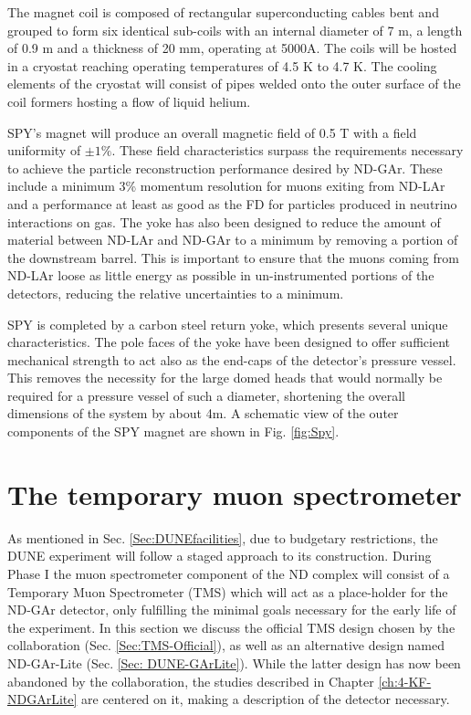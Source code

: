 The magnet coil is composed of rectangular superconducting cables bent and grouped to form six identical sub-coils with an internal diameter of 7 m, a length of 0.9 m and a thickness of 20 mm, operating at 5000A. The coils will be hosted in a cryostat reaching operating temperatures of 4.5 K to 4.7 K. The cooling elements of the cryostat will consist of pipes welded onto the outer surface of the coil formers hosting a flow of liquid helium. 

SPY's magnet will produce an overall magnetic field of 0.5 T with a field uniformity of $\pm 1\%$. These field characteristics surpass the requirements necessary to achieve the particle reconstruction performance desired by ND-GAr. These include a minimum 3\% momentum resolution for muons exiting from ND-LAr and a performance at least as good as the FD for particles produced in neutrino interactions on gas. The yoke has also been designed to reduce the amount of material between ND-LAr and ND-GAr to a minimum by removing a portion of the downstream barrel. This is important to ensure that the muons coming from ND-LAr loose as little energy as possible in un-instrumented portions of the detectors, reducing the relative uncertainties to a minimum.

SPY is completed by a carbon steel return yoke, which presents several unique characteristics. The pole faces of the yoke have been designed to offer sufficient mechanical strength to act also as the end-caps of the detector's pressure vessel. This removes the necessity for the large domed heads that would normally be required for a pressure vessel of such a diameter, shortening the overall dimensions of the system by about 4m. A schematic view of the outer components of the SPY magnet are shown in Fig. \ref{fig:Spy}.

\section{The temporary muon spectrometer}
\label{Sec:TMS}
As mentioned in Sec. \ref{Sec:DUNEfacilities}, due to budgetary restrictions, the DUNE experiment will follow a staged approach to its construction. During Phase I the muon spectrometer component of the ND complex will consist of a Temporary Muon Spectrometer (TMS) which will act as a place-holder for the ND-GAr detector, only fulfilling the minimal goals necessary for the early life of the experiment. In this section we discuss the official TMS design chosen by the collaboration (Sec. \ref{Sec:TMS-Official}), as well as an alternative design named ND-GAr-Lite (Sec. \ref{Sec: DUNE-GArLite}). While the latter design has now been abandoned by the collaboration, the studies described in Chapter \ref{ch:4-KF-NDGArLite} are centered on it, making a description of the detector necessary.

